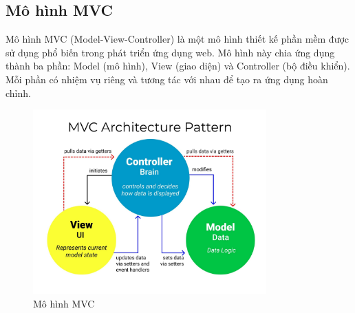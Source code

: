         \subsection{Mô hình MVC}
            \hspace*{0.6cm}Mô hình MVC (Model-View-Controller) là một mô hình thiết kế phần mềm được sử dụng phổ biến trong phát triển ứng dụng web. Mô hình này chia ứng dụng thành ba phần: Model (mô hình), View (giao diện) và Controller (bộ điều khiển). Mỗi phần có nhiệm vụ riêng và tương tác với nhau để tạo ra ứng dụng hoàn chỉnh.
            \begin{figure}[H]
                \centering
                \includegraphics[width=0.8\textwidth]{pictures/MVC.png}
                \caption{Mô hình MVC}
                \label{fig:mvc}
            \end{figure}
